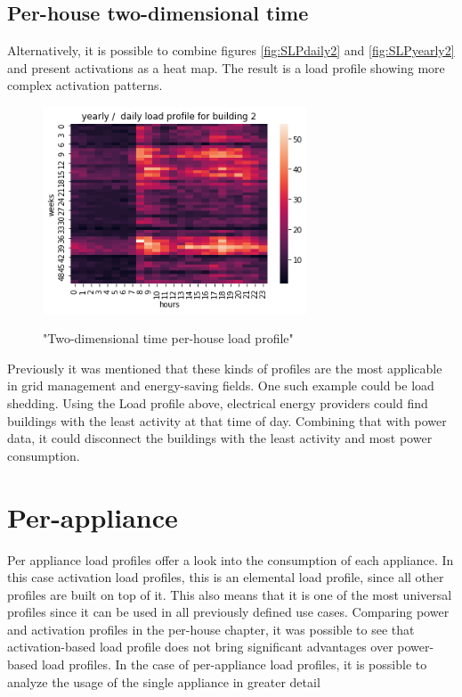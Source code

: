 \subsection{Per-house two-dimensional time}

Alternatively, it is possible to combine figures \ref{fig:SLPdaily2} and \ref{fig:SLPyearly2} and present activations as a heat map.
The result is a load profile showing more complex activation patterns.

\begin{figure}[H]
	\centering
	\caption{"Two-dimensional time per-house load profile"}
	\includegraphics[width=0.7\textwidth]{../Figures/LPS/SLPHMyearly2.png}
	\label{fig:SLPHMyearly2}
\end{figure}

Previously it was mentioned that these kinds of profiles are the most applicable in grid management and energy-saving fields. 
One such example could be load shedding.
Using the Load profile above, electrical energy providers could find buildings with the least activity at that time of day.
Combining that with power data, it could disconnect the buildings with the least activity and most power consumption.

\section{Per-appliance}

Per appliance load profiles offer a look into the consumption of each appliance. 
In this case activation load profiles, this is an elemental load profile, since all other 
profiles are built on top of it. 
This also means that it is one of the most universal profiles since it can be used in all previously defined use cases.
Comparing power and activation profiles in the per-house chapter,
it was possible to see that activation-based load profile does not bring significant advantages over power-based load profiles.
In the case of per-appliance load profiles, it is possible to analyze the usage of the single appliance in greater detail

